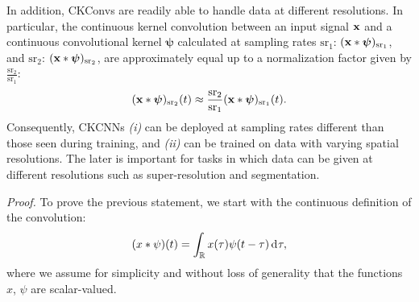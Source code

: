 \documentclass{article}
\def\sR{{\mathbb{R}}}
\renewcommand{\vec}[1]{\ensuremath{\mathbf{\MakeLowercase{{#1}}}}}
\newcommand{\xv}{\vec{x}}
\def\sR{{\mathbb{R}}}
\newcommand{\du}{\mathrm{d}\mkern1mu}
\begin{document}
In addition, CKConvs are readily able to handle data at different resolutions. In particular, the continuous kernel convolution between an input signal $\xv$ and a continuous convolutional kernel $\boldsymbol{\psi}$ calculated at sampling rates $\mathrm{sr}_1$: $(\xv *\boldsymbol{\psi})_\mathrm{sr_1}$, and $\mathrm{sr_2}$: $(\xv *\boldsymbol{\psi})_\mathrm{sr_2}$, are approximately equal up to a normalization factor given by $\tfrac{\mathrm{sr_2}}{\mathrm{sr_1}}$:
\begin{equation*}
\setlength{\abovedisplayskip}{3.5pt}
\setlength{\belowdisplayskip}{3.5pt}
    (\xv *\boldsymbol{\psi})_\mathrm{sr_2}(t) \approx \frac{\mathrm{sr_2}}{\mathrm{sr_1}}(\xv *\boldsymbol{\psi})_\mathrm{sr_1}(t).
\end{equation*}
Consequently, CKCNNs \emph{(i)} can be deployed at sampling rates different than those seen during training, and \emph{(ii)} can be trained on data with varying spatial resolutions. The later is important for tasks in which data can be given at different resolutions such as super-resolution and segmentation. 

\textit{Proof.} To prove the previous statement, we start with the continuous definition of the convolution:
\begin{equation*}
\setlength{\abovedisplayskip}{3.5pt}
\setlength{\belowdisplayskip}{3.5pt}
    (x * \psi)(t) = \int_{\sR} x(\tau) \psi(t - \tau) \, \du \tau,
\end{equation*}
where we assume for simplicity and without loss of generality that the functions $x$, $\psi$ are scalar-valued. 
\end{document}
